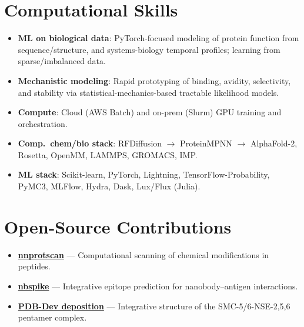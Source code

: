 \documentclass[9pt, letterpaper]{article}
\begin{document}
{%
\section{Computational Skills}

\begin{itemize}
    \item \textbf{ML on biological data}: PyTorch-focused modeling of protein function from sequence/structure, and systems-biology temporal profiles; learning from sparse/imbalanced data.
    
    \item \textbf{Mechanistic modeling}: Rapid prototyping of binding, avidity, selectivity, and stability via statistical-mechanics-based tractable likelihood models.
    
    \item \textbf{Compute}: Cloud (AWS Batch) and on-prem (Slurm) GPU training and orchestration.
    
    \item \textbf{Comp.\ chem/bio stack}: RFDiffusion $\to$ ProteinMPNN $\to$ AlphaFold-2, Rosetta, OpenMM, LAMMPS, GROMACS, IMP.
    
    \item \textbf{ML stack}: Scikit-learn, PyTorch, Lightning, TensorFlow-Probability, PyMC3, MLFlow, Hydra, Dask, Lux/Flux (Julia).
\end{itemize}

\section{Open-Source Contributions}

\begin{itemize}
  \item \href{https://github.com/novonordisk-research/nnprotscan}{\textbf{nnprotscan}} --- Computational scanning of chemical modifications in peptides.
  
  \item \href{https://github.com/integrativemodeling/nbspike}{\textbf{nbspike}} --- Integrative epitope prediction for nanobody--antigen interactions.
  
  \item \href{https://pdb-ihm.org/entry.html?9A19}{\textbf{PDB-Dev deposition}} --- Integrative structure of the SMC-5/6-NSE-{2,5,6} pentamer complex.
  

\end{itemize}}
\end{document}
